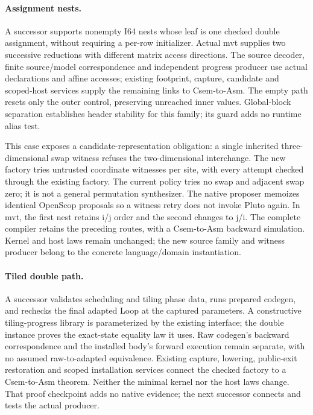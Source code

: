\paragraph{Assignment nests.}
A successor supports nonempty I64 nests whose leaf is one checked double
assignment, without requiring a per-row initializer. Actual mvt supplies two
successive reductions with different matrix access directions. The source
decoder, finite source/model correspondence and independent progress producer
use actual declarations and affine accesses; existing footprint, capture,
candidate and scoped-host services supply the remaining links to Csem-to-Asm.
The empty path resets only the outer control, preserving unreached inner
values. Global-block separation establishes header stability for this family;
its guard adds no runtime alias test.

This case exposes a candidate-representation obligation: a single inherited
three-dimensional swap witness refuses the two-dimensional interchange.
The new factory tries untrusted coordinate witnesses per site, with every
attempt checked through the existing factory. The current policy tries no
swap and adjacent swap zero; it is not a general permutation synthesizer.
The native proposer memoizes identical OpenScop proposals so a witness retry
does not invoke Pluto again. In mvt, the first nest retains i/j order and
the second changes to j/i. The complete compiler retains the preceding routes,
with a Csem-to-Asm backward simulation. Kernel and host laws remain unchanged;
the new source family and witness producer belong to
the concrete language/domain instantiation.

\paragraph{Tiled double path.}
A successor validates scheduling and tiling phase data, runs prepared codegen,
and rechecks the final adapted Loop at the captured parameters. A constructive
tiling-progress library is parameterized by the existing  interface;
the double instance proves the exact-state equality law it uses. Raw codegen's
backward correspondence and the installed body's forward execution remain
separate, with no assumed raw-to-adapted equivalence. Existing capture, lowering,
public-exit restoration and scoped installation services connect the checked
factory to a Csem-to-Asm theorem. Neither the minimal kernel nor the host laws
change. That proof checkpoint adds no native evidence; the next successor
connects and tests the actual producer.

